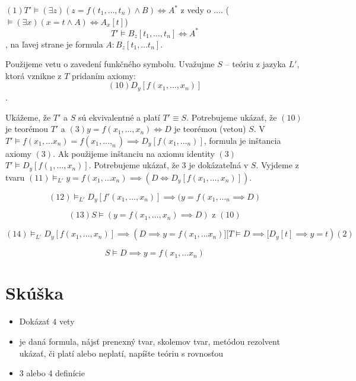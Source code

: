 \par $(1) T' \models (\exists z) (z = f (t_1, \ldots, t_n) \land B) \iff A^*$ z
vedy o .... ($\models (\exists x) (x=t \land A) \iff A_x[t]$)
$$T' \models B_z[t_1, \ldots, t_n] \iff A^*$$, na ľavej strane je formula $A:
B_z[t_1, \ldots t_n]$.

\par Použijeme vetu o zavedení funkčného symbolu. Uvažujme $S$ -- teóriu z
jazyka $L'$, ktorá vznikne z $T$ pridaním axiomy:
$$(10) D_y[f(x_1, \ldots, x_n)]$$.

Ukážeme, že $T'$ a $S$ sú ekvivalentné a platí $T' \equiv S$. Potrebujeme
ukázať, že $(10)$ je teorémou $T'$ a $(3) y=f(x_1, \ldots, x_n) \iff D$ je
teorémou (vetou) $S$. V $T' \models f(x_1, \ldots x_n) = f(x_1, \ldots, _n)
\implies D_y[f(x_1, \ldots _n)]$, formula je inštancia axiomy $(3)$. Ak
použijeme inštanciu na axiomu identity $(3)$ $T' \models D_y[f(_1, \ldots,
x_n)]$. Potrebujeme ukázať, že $3$ je dokázateľná v $S$. Vyjdeme z tvaru $(11)
\models_{L'} y = f(x_1, \ldots x_n) \implies (D \iff D_y[f(x_1, \ldots, x_n)])$.

$$(12) \models_{L'} D_y[f'(x_1, \ldots, x_n)] \implies (y = f(x_1, \ldots _n
\implies D) $$

$$(13) S \models (y = f(x_1, \ldots, x_n) \implies D) \mbox{ z $(10)$}$$

$$(14) \models_{L'} D_y[f(x_1, \ldots, x_n) ] \implies (D \implies y = f(x_1,
\ldots x_n)] [T \models D \implies [D_y[t] \implies y = t) (2)$$


$$S \models D \implies y = f(x_1, \ldots x_n)$$

\chapter{Skúška}

\begin{itemize}
	\item Dokázať $4$ vety
	\item je daná formula, nájsť prenexný tvar, skolemov tvar, metódou
	rezolvent ukázať, či platí alebo neplatí, napíšte teóriu s rovnosťou
	\item 3 alebo 4 definície
\end{itemize}



